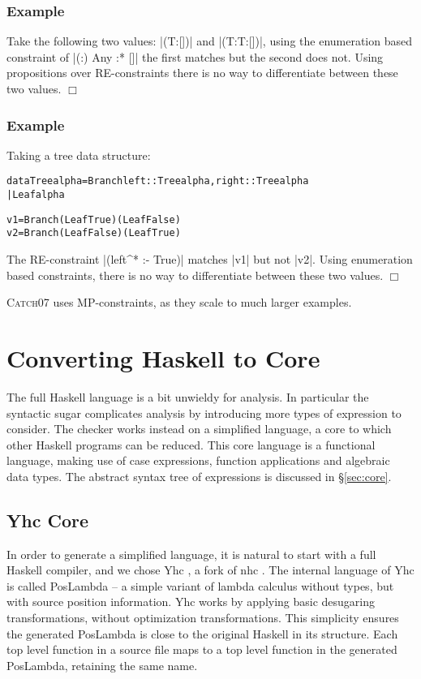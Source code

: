 \documentclass[preprint]{sigplanconf}
\newcommand{\catch}{\textsc{Catch}}
\newcounter{exmp}
\newcommand{\yesexample}{\subsubsection*{Example \arabic{exmp}}\addtocounter{exmp}{1}}
\newcommand{\noexample}{\hfill$\Box$}
\newenvironment{code}{\begin{alltt}\small}{\end{alltt}}
\newenvironment{example}{\yesexample}{\noexample}
\begin{document}
\begin{example}
Take the following two values: |(T:[])| and |(T:T:[])|, using the enumeration based constraint of |{(:) Any} :* {[]}| the first matches but the second does not. Using propositions over RE-constraints there is no way to differentiate between these two values.
\end{example}

\begin{example}
Taking a tree data structure:

\begin{code}
data Tree alpha  =  Branch {left :: Tree alpha, right :: Tree alpha}
                 |  Leaf alpha

v1 = Branch (Leaf True   ) (Leaf False  )
v2 = Branch (Leaf False  ) (Leaf True   )
\end{code}

The RE-constraint |(left^* :- True)| matches |v1| but not |v2|. Using enumeration based constraints, there is no way to differentiate between these two values.
\end{example}

\catch07 uses MP-constraints, as they scale to much larger examples.

\section{Converting Haskell to Core}
\label{sec:transform}

The full Haskell language is a bit unwieldy for analysis. In particular the syntactic sugar complicates analysis by introducing more types of expression to consider. The checker works instead on a simplified language, a core to which other Haskell programs can be reduced. This core language is a functional language, making use of case expressions, function applications and algebraic data types. The abstract syntax tree of expressions is discussed in \S\ref{sec:core}.

\subsection{Yhc Core}

In order to generate a simplified language, it is natural to start with a full Haskell compiler, and we chose Yhc \citep{Yhc}, a fork of nhc \citep{nhc}. The internal language of Yhc is called PosLambda -- a simple variant of lambda calculus without types, but with source position information. Yhc works by applying basic desugaring transformations, without optimization transformations. This simplicity ensures the generated PosLambda is close to the original Haskell in its structure. Each top level function in a source file maps to a top level function in the generated PosLambda, retaining the same name.
\end{document}
